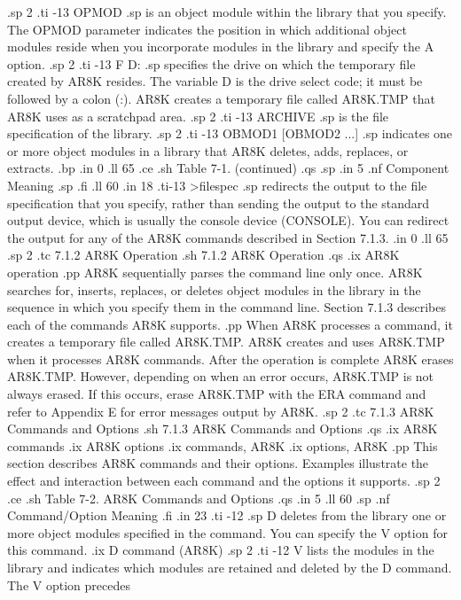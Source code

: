 .sp 2
.ti -13
OPMOD        
.sp
is an object module within the library that you specify.
The OPMOD parameter indicates the position in which additional object modules
reside when you incorporate modules in the library and specify the
A option. 
.sp 2
.ti -13
F D:         
.sp
specifies the drive on which the temporary file
created by AR8K resides.  The variable D is the drive select
code; it must be followed by a colon (:).  AR8K creates a
temporary file called AR8K.TMP that AR8K uses as a scratchpad
area. 
.sp 2
.ti -13
ARCHIVE      
.sp
is the file specification of the library.
.sp 2
.ti -13
OBMOD1 [OBMOD2 ...] 
.sp
indicates one or more object modules in a library that AR8K
deletes, adds, replaces, or extracts. 
.bp
.in 0
.ll 65
.ce
.sh
Table 7-1.  (continued)
.qs
.sp
.in 5
.nf
Component    Meaning
.sp
.fi
.ll 60
.in 18
.ti-13
>filespec    
.sp
redirects the output to the file specification that you specify,
rather than sending the output to the standard output device,
which is usually the console device (CONSOLE).  You can redirect
the output for any of the AR8K commands described in Section 7.1.3.
.in 0
.ll 65
.sp 2
.tc         7.1.2  AR8K Operation
.sh
7.1.2  AR8K Operation 
.qs
.ix AR8K operation
.pp
AR8K sequentially parses the command line only once.  AR8K
searches for, inserts, replaces, or deletes object modules in
the library in the sequence in which you specify them in the
command line.  Section 7.1.3 describes each of the commands 
AR8K supports. 
.pp
When AR8K processes a command, it creates a temporary file called AR8K.TMP.  
AR8K creates and uses AR8K.TMP when it processes AR8K commands.  After
the operation is complete AR8K erases AR8K.TMP.  However, depending on when
an error occurs, AR8K.TMP is not always erased.  If this occurs, erase
AR8K.TMP with the ERA command and refer to Appendix E for error messages
output by AR8K. 
.sp 2
.tc         7.1.3  AR8K Commands and Options
.sh 
7.1.3  AR8K Commands and Options
.qs
.ix AR8K commands
.ix AR8K options
.ix commands, AR8K
.ix options, AR8K
.pp
This section describes AR8K commands and their options.  Examples
illustrate the effect and interaction between each command and the 
options it supports.
.sp 2
.ce
.sh
Table 7-2.  AR8K Commands and Options
.qs
.in 5
.ll 60
.sp
.nf
Command/Option                   Meaning
.fi
.in 23
.ti -12
.sp
D           deletes from the library one or more object modules
specified in the command.  You can specify
the V option for this command. 
.ix D command (AR8K)
.sp 2
.ti -12
V           lists the modules in the library and indicates which modules
are retained and deleted by the D command.  The V option precedes
